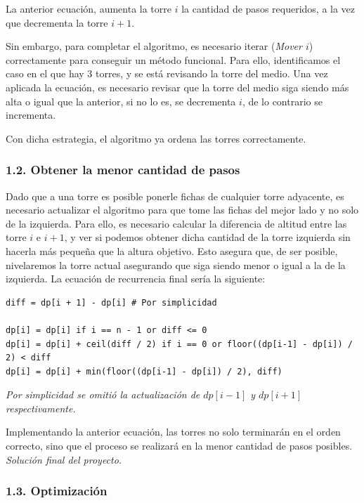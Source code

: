 \documentclass[
]{article}
\begin{document}
La anterior ecuación, aumenta la torre \(i\) la cantidad de pasos
requeridos, a la vez que decrementa la torre \(i+1\).

Sin embargo, para completar el algoritmo, es necesario iterar
(\emph{Mover \(i\)}) correctamente para conseguir un método funcional.
Para ello, identificamos el caso en el que hay 3 torres, y se está
revisando la torre del medio. Una vez aplicada la ecuación, es necesario
revisar que la torre del medio siga siendo más alta o igual que la
anterior, si no lo es, se decrementa \(i\), de lo contrario se
incrementa.

Con dicha estrategia, el algoritmo ya ordena las torres correctamente.

\hypertarget{obtener-la-menor-cantidad-de-pasos}{%
\subsubsection{1.2. Obtener la menor cantidad de
pasos}\label{obtener-la-menor-cantidad-de-pasos}}

Dado que a una torre es posible ponerle fichas de cualquier torre
adyacente, es necesario actualizar el algoritmo para que tome las fichas
del mejor lado y no solo de la izquierda. Para ello, es necesario
calcular la diferencia de altitud entre las torre \(i\) e \(i + 1\), y
ver si podemos obtener dicha cantidad de la torre izquierda sin hacerla
más pequeña que la altura objetivo. Esto asegura que, de ser posible,
nivelaremos la torre actual asegurando que siga siendo menor o igual a
la de la izquierda. La ecuación de recurrencia final sería la siguiente:

\begin{verbatim}
diff = dp[i + 1] - dp[i] # Por simplicidad

dp[i] = dp[i] if i == n - 1 or diff <= 0
dp[i] = dp[i] + ceil(diff / 2) if i == 0 or floor((dp[i-1] - dp[i]) / 2) < diff
dp[i] = dp[i] + min(floor((dp[i-1] - dp[i]) / 2), diff)
\end{verbatim}

\emph{Por simplicidad se omitió la actualización de \(dp[i - 1]\) y
\(dp[i + 1]\) respectivamente.}

Implementando la anterior ecuación, las torres no solo terminarán en el
orden correcto, sino que el proceso se realizará en la menor cantidad de
pasos posibles. \emph{Solución final del proyecto.}

\hypertarget{optimizaciuxf3n}{%
\subsubsection{1.3. Optimización}\label{optimizaciuxf3n}}
\end{document}
